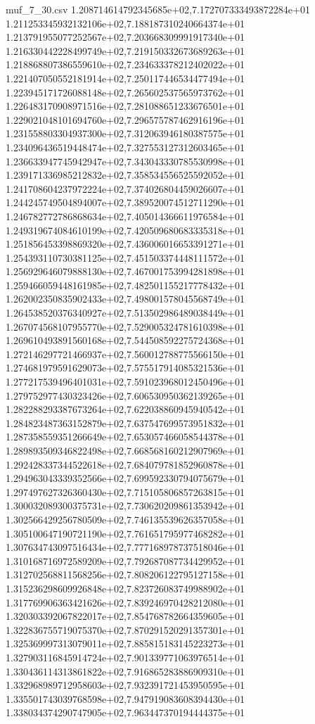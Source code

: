 \begin{filecontents*}{muf_7_30.csv}
1.208714614792345685e+02,7.172707333493872284e+01
1.211253345932132106e+02,7.188187310240664374e+01
1.213791955077252567e+02,7.203668309991917340e+01
1.216330442228499749e+02,7.219150332673689263e+01
1.218868807386559610e+02,7.234633378212402022e+01
1.221407050552181914e+02,7.250117446534477494e+01
1.223945171726088148e+02,7.265602537565973762e+01
1.226483170908971516e+02,7.281088651233676501e+01
1.229021048101694760e+02,7.296575787462916196e+01
1.231558803304937300e+02,7.312063946180387575e+01
1.234096436519448474e+02,7.327553127312603465e+01
1.236633947745942947e+02,7.343043330785530998e+01
1.239171336985212832e+02,7.358534556525592052e+01
1.241708604237972224e+02,7.374026804459026607e+01
1.244245749504894007e+02,7.389520074512711290e+01
1.246782772786868634e+02,7.405014366611976584e+01
1.249319674084610199e+02,7.420509680683335318e+01
1.251856453398869320e+02,7.436006016653391271e+01
1.254393110730381125e+02,7.451503374448111572e+01
1.256929646079888130e+02,7.467001753994281898e+01
1.259466059448161985e+02,7.482501155217778432e+01
1.262002350835902433e+02,7.498001578045568749e+01
1.264538520376340927e+02,7.513502986489038449e+01
1.267074568107955770e+02,7.529005324781610398e+01
1.269610493891560168e+02,7.544508592275724368e+01
1.272146297721466937e+02,7.560012788775566150e+01
1.274681979591629073e+02,7.575517914085321536e+01
1.277217539496401031e+02,7.591023968012450496e+01
1.279752977430323426e+02,7.606530950362139265e+01
1.282288293387673264e+02,7.622038860945940542e+01
1.284823487363152879e+02,7.637547699573951832e+01
1.287358559351266649e+02,7.653057466058544378e+01
1.289893509346822498e+02,7.668568160212907969e+01
1.292428337344522618e+02,7.684079781852960878e+01
1.294963043339352566e+02,7.699592330794075679e+01
1.297497627326360430e+02,7.715105806857263815e+01
1.300032089300375731e+02,7.730620209861353942e+01
1.302566429256780509e+02,7.746135539626357058e+01
1.305100647190721190e+02,7.761651795977468282e+01
1.307634743097516434e+02,7.777168978737518046e+01
1.310168716972589209e+02,7.792687087734429952e+01
1.312702568811568256e+02,7.808206122795127158e+01
1.315236298609926848e+02,7.823726083749988902e+01
1.317769906363421626e+02,7.839246970428212080e+01
1.320303392067822017e+02,7.854768782664359605e+01
1.322836755719075370e+02,7.870291520291357301e+01
1.325369997313079011e+02,7.885815183145223273e+01
1.327903116845914724e+02,7.901339771063976514e+01
1.330436114313861822e+02,7.916865283886909310e+01
1.332968989712958603e+02,7.932391721453950595e+01
1.335501743039768598e+02,7.947919083608394430e+01
1.338034374290747905e+02,7.963447370194444375e+01

\end{filecontents*}
